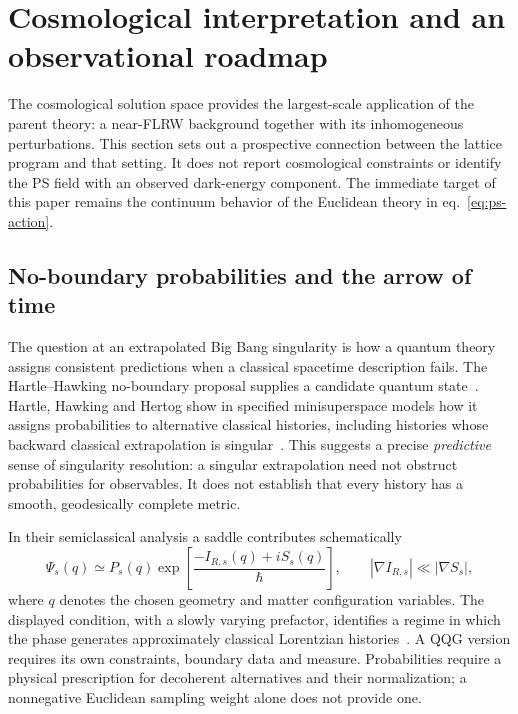 \section{Cosmological interpretation and an observational roadmap}
\label{sec:cosmology}

The cosmological solution space provides the largest-scale application of the parent theory: a near-FLRW background together with its inhomogeneous perturbations.  This section sets out a prospective connection between the lattice program and that setting.  It does not report cosmological constraints or identify the PS field with an observed dark-energy component.  The immediate target of this paper remains the continuum behavior of the Euclidean theory in eq.~\eqref{eq:ps-action}.

\subsection{No-boundary probabilities and the arrow of time}
\label{sec:no-boundary-arrow}

The question at an extrapolated Big Bang singularity is how a quantum theory assigns consistent predictions when a classical spacetime description fails.  The Hartle--Hawking no-boundary proposal supplies a candidate quantum state~\cite{HartleHawking:1983}.  Hartle, Hawking and Hertog show in specified minisuperspace models how it assigns probabilities to alternative classical histories, including histories whose backward classical extrapolation is singular~\cite{HartleHawkingHertog:2008}.  This suggests a precise \emph{predictive} sense of singularity resolution: a singular extrapolation need not obstruct probabilities for observables.  It does not establish that every history has a smooth, geodesically complete metric.

In their semiclassical analysis a saddle contributes schematically
\begin{equation}
 \Psi_s(q)\simeq P_s(q)\exp\left[\frac{-I_{R,s}(q)+iS_s(q)}{\hbar}\right],
 \qquad |\nabla I_{R,s}|\ll|\nabla S_s|,
 \label{eq:no-boundary-classicality}
\end{equation}
where $q$ denotes the chosen geometry and matter configuration variables.  The displayed condition, with a slowly varying prefactor, identifies a regime in which the phase generates approximately classical Lorentzian histories~\cite{HartleHawkingHertog:2008}.  A QQG version requires its own constraints, boundary data and measure.  Probabilities require a physical prescription for decoherent alternatives and their normalization; a nonnegative Euclidean sampling weight alone does not provide one.

